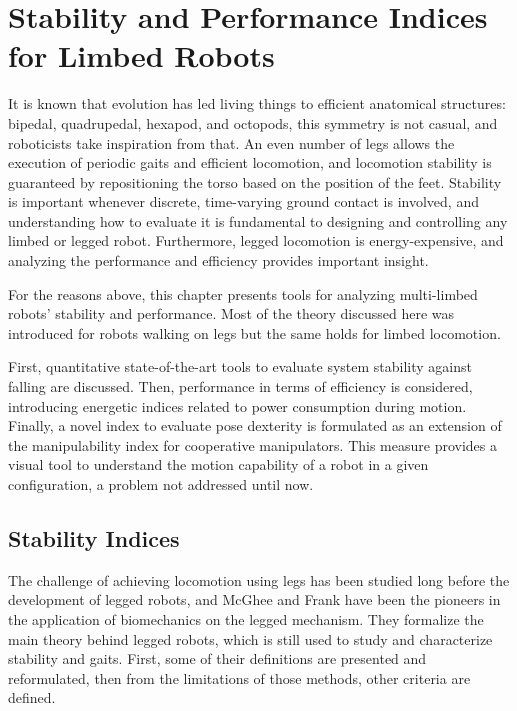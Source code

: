 \chapter{Stability and Performance Indices for Limbed Robots}
\label{ch:chapter_three}%

It is known that evolution has led living things to efficient anatomical structures: bipedal, quadrupedal\cite{bipedalVSquadrupedal}, hexapod, and octopods, 
this symmetry is not casual, and roboticists take inspiration from that\cite{robotsymmetry}.
An even number of legs allows the execution of periodic gaits and efficient locomotion\cite{LeggedSurvey}, and locomotion stability is guaranteed by repositioning the torso based on the position of the feet.
Stability is important whenever discrete, time-varying ground contact is involved, and understanding how to evaluate it is fundamental to designing and controlling any limbed or legged robot. Furthermore, legged locomotion is energy-expensive, and analyzing the performance and efficiency provides important insight.   

For the reasons above, this chapter presents tools for analyzing multi-limbed robots' stability and performance. Most of the theory discussed here was introduced for robots walking on legs but the same holds for limbed locomotion. 

First, quantitative state-of-the-art tools to evaluate system stability against falling are discussed. Then, performance in terms of efficiency is considered, introducing energetic indices related to power consumption during motion. 
Finally, a novel index to evaluate pose dexterity is formulated as an extension of the manipulability index for cooperative manipulators. This measure provides a visual tool to understand the motion capability of a robot in a given configuration, a problem not addressed until now. 

\section{Stability Indices}
\label{sec:stability_indices}
The challenge of achieving locomotion using legs has been studied long before the development of legged robots\cite{animalsInMotion}\cite{InsectLeggedWalking},
and McGhee and Frank have been the pioneers in the application of biomechanics on the legged mechanism\cite{LocomotionLeggedStudy}\cite{McGhee}\cite{Frank1968}.
They formalize the main theory behind legged robots, which is still used to study and characterize stability and gaits. First, some of their definitions are presented and reformulated, then from the limitations of those methods, other criteria are defined. 

